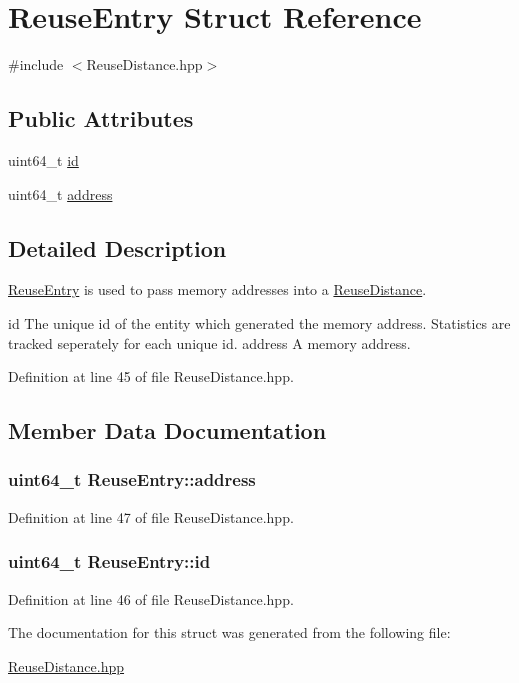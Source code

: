 \hypertarget{struct_reuse_entry}{
\section{ReuseEntry Struct Reference}
\label{struct_reuse_entry}
}


{\ttfamily \#include $<$ReuseDistance.hpp$>$}

\subsection*{Public Attributes}
\begin{DoxyCompactItemize}
\item 
uint64\_\-t \hyperlink{struct_reuse_entry_ab30e9a6fae29a6453f5fa2245e441f3a}{id}
\item 
uint64\_\-t \hyperlink{struct_reuse_entry_a40bd37796c5f75438f28f5b6d090a432}{address}
\end{DoxyCompactItemize}


\subsection{Detailed Description}
\hyperlink{struct_reuse_entry}{ReuseEntry} is used to pass memory addresses into a \hyperlink{class_reuse_distance}{ReuseDistance}.

id The unique id of the entity which generated the memory address. Statistics are tracked seperately for each unique id.  address A memory address. 

Definition at line 45 of file ReuseDistance.hpp.



\subsection{Member Data Documentation}
\hypertarget{struct_reuse_entry_a40bd37796c5f75438f28f5b6d090a432}{
\subsubsection[{address}]{\setlength{\rightskip}{0pt plus 5cm}uint64\_\-t {\bf ReuseEntry::address}}}
\label{struct_reuse_entry_a40bd37796c5f75438f28f5b6d090a432}


Definition at line 47 of file ReuseDistance.hpp.

\hypertarget{struct_reuse_entry_ab30e9a6fae29a6453f5fa2245e441f3a}{
\subsubsection[{id}]{\setlength{\rightskip}{0pt plus 5cm}uint64\_\-t {\bf ReuseEntry::id}}}
\label{struct_reuse_entry_ab30e9a6fae29a6453f5fa2245e441f3a}


Definition at line 46 of file ReuseDistance.hpp.



The documentation for this struct was generated from the following file:\begin{DoxyCompactItemize}
\item 
\hyperlink{_reuse_distance_8hpp}{ReuseDistance.hpp}\end{DoxyCompactItemize}
